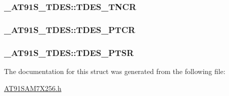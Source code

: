 \hypertarget{struct__AT91S__TDES_af8553eda9742f8c89053ad88bccc477}{
\subsubsection{ {\bf \_\-AT91S\_\-TDES::TDES\_\-TNCR}}}
\label{struct__AT91S__TDES_af8553eda9742f8c89053ad88bccc477}


\hypertarget{struct__AT91S__TDES_d0db911eb6744ae5f818f57053632572}{
\subsubsection{ {\bf \_\-AT91S\_\-TDES::TDES\_\-PTCR}}}
\label{struct__AT91S__TDES_d0db911eb6744ae5f818f57053632572}


\hypertarget{struct__AT91S__TDES_22ad54204fae8aeefbdcb643c87967b4}{
\subsubsection{ {\bf \_\-AT91S\_\-TDES::TDES\_\-PTSR}}}
\label{struct__AT91S__TDES_22ad54204fae8aeefbdcb643c87967b4}




The documentation for this struct was generated from the following file:\begin{CompactItemize}
\item 
\hyperlink{AT91SAM7X256_8h}{AT91SAM7X256.h}\end{CompactItemize}
